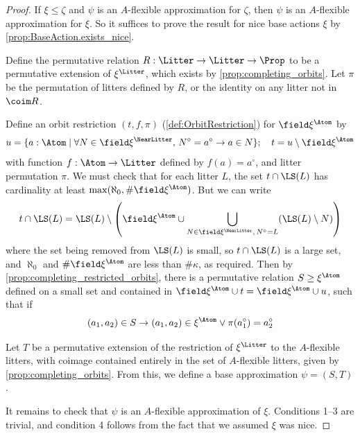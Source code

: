 \begin{proof}
  \leanok
  If \( \xi \leq \zeta \) and \( \psi \) is an \( A \)-flexible approximation for \( \zeta \), then \( \psi \) is an \( A \)-flexible approximation for \( \xi \).
  So it suffices to prove the result for nice base actions \( \xi \) by \cref{prop:BaseAction.exists_nice}.

  Define the permutative relation \( R : \Litter \to \Litter \to \Prop \) to be a permutative extension of \( \xi^\Litter \), which exists by \cref{prop:completing_orbits}.
  Let \( \pi \) be the permutation of litters defined by \( R \), or the identity on any litter not in \( \coim R \).

  Define an orbit restriction \( (t, f, \pi) \) (\cref{def:OrbitRestriction}) for \( \field \xi^\Atom \) by
  \[ u = \{ a : \Atom \mid \forall N \in \field \xi^\NearLitter,\, N^\circ = a^\circ \to a \in N \};\quad t = u \setminus \field \xi^\Atom \]
  with function \( f : \Atom \to \Litter \) defined by \( f(a) = a^\circ \), and litter permutation \( \pi \).
  We must check that for each litter \( L \), the set \( t \cap \LS(L) \) has cardinality at least \( \max(\aleph_0, \#\field \xi^\Atom) \).
  But we can write
  \[ t \cap \LS(L) = \LS(L) \setminus \left( \field \xi^\Atom \cup \bigcup_{N \in \field \xi^\NearLitter,\, N^\circ = L} (\LS(L) \setminus N) \right) \]
  where the set being removed from \( \LS(L) \) is small, so \( t \cap \LS(L) \) is a large set, and \( \aleph_0 \) and \( \#\field \xi^\Atom \) are less than \( \#\kappa \), as required.
  Then by \cref{prop:completing_restricted_orbits}, there is a permutative relation \( S \geq \xi^\Atom \) defined on a small set and contained in \( \field \xi^\Atom \cup t = \field \xi^\Atom \cup u \), such that if
  \[ (a_1, a_2) \in S \to (a_1, a_2) \in \xi^\Atom \vee \pi(a_1^\circ) = a_2^\circ \]

  Let \( T \) be a permutative extension of the restriction of \( \xi^\Litter \) to the \( A \)-flexible litters, with coimage contained entirely in the set of \( A \)-flexible litters, given by \cref{prop:completing_orbits}.
  From this, we define a base approximation \( \psi = (S, T) \).

  It remains to check that \( \psi \) is an \( A \)-flexible approximation of \( \xi \).
  Conditions 1--3 are trivial, and condition 4 follows from the fact that we assumed \( \xi \) was nice.


\end{proof}
